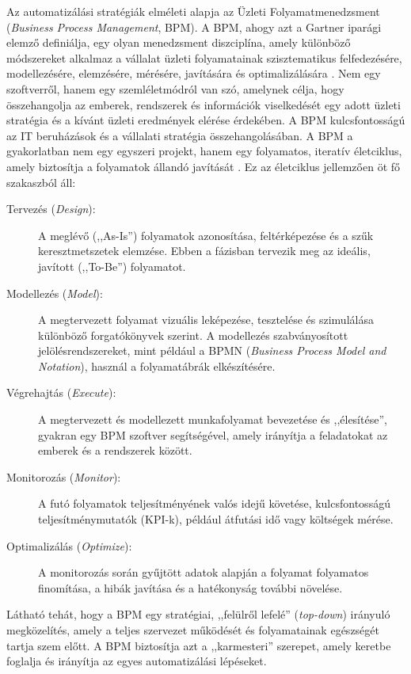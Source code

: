 Az automatizálási stratégiák elméleti alapja az Üzleti Folyamatmenedzsment (\textit{Business Process Management}, BPM).
A BPM, ahogy azt a Gartner iparági elemző definiálja, egy olyan menedzsment diszciplína, amely különböző módszereket alkalmaz a vállalat üzleti folyamatainak szisztematikus felfedezésére, modellezésére, elemzésére, mérésére, javítására és optimalizálására \cite{Garner-BPM}.
Nem egy szoftverről, hanem egy szemléletmódról van szó, amelynek célja, hogy összehangolja az emberek, rendszerek és információk viselkedését egy adott üzleti stratégia és a kívánt üzleti eredmények elérése érdekében.
A BPM kulcsfontosságú az IT beruházások és a vállalati stratégia összehangolásában.
A BPM a gyakorlatban nem egy egyszeri projekt, hanem egy folyamatos, iteratív életciklus, amely biztosítja a folyamatok állandó javítását \cite{IBM-BPM}.
Ez az életciklus jellemzően öt fő szakaszból áll:
\begin{description}
    \item[Tervezés (\textit{Design}):] A meglévő (,,As-Is'') folyamatok azonosítása, feltérképezése és a szűk keresztmetszetek elemzése.
    Ebben a fázisban tervezik meg az ideális, javított (,,To-Be'') folyamatot.
    \item[Modellezés (\textit{Model}):] A megtervezett folyamat vizuális leképezése, tesztelése és szimulálása különböző forgatókönyvek szerint.
    A modellezés szabványosított jelölésrendszereket, mint például a BPMN (\textit{Business Process Model and Notation}), használ a folyamatábrák elkészítésére.
    \item[Végrehajtás (\textit{Execute}):] A megtervezett és modellezett munkafolyamat bevezetése és ,,élesítése'', gyakran egy BPM szoftver segítségével, amely irányítja a feladatokat az emberek és a rendszerek között.
    \item[Monitorozás (\textit{Monitor}):] A futó folyamatok teljesítményének valós idejű követése, kulcsfontosságú teljesítménymutatók (KPI-k), például átfutási idő vagy költségek mérése.
    \item[Optimalizálás (\textit{Optimize}):] A monitorozás során gyűjtött adatok alapján a folyamat folyamatos finomítása, a hibák javítása és a hatékonyság további növelése.
\end{description}
Látható tehát, hogy a BPM egy stratégiai, ,,felülről lefelé'' (\textit{top-down}) irányuló megközelítés, amely a teljes szervezet működését és folyamatainak egészségét tartja szem előtt.
A BPM biztosítja azt a ,,karmesteri'' szerepet, amely keretbe foglalja és irányítja az egyes automatizálási lépéseket.


